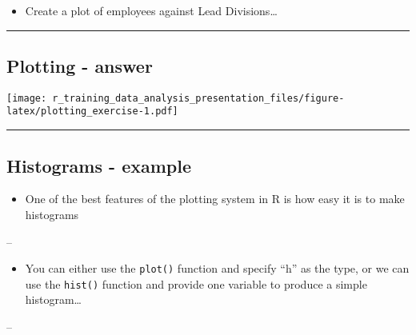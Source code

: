 \documentclass[]{article}
\newenvironment{Shaded}{\begin{snugshade}}{\end{snugshade}}
\newcommand{\DataTypeTok}[1]{\textcolor[rgb]{0.13,0.29,0.53}{#1}}
\newcommand{\KeywordTok}[1]{\textcolor[rgb]{0.13,0.29,0.53}{\textbf{#1}}}
\newcommand{\NormalTok}[1]{#1}
\newcommand{\OperatorTok}[1]{\textcolor[rgb]{0.81,0.36,0.00}{\textbf{#1}}}
\providecommand{\tightlist}{%
  \setlength{\itemsep}{0pt}\setlength{\parskip}{0pt}}
\begin{document}
\begin{itemize}
\tightlist
\item
  Create a plot of employees against Lead Divisions\ldots{}
\end{itemize}

\begin{center}\rule{0.5\linewidth}{\linethickness}\end{center}

\hypertarget{plotting---answer}{%
\subsection{Plotting - answer}\label{plotting---answer}}

\begin{Shaded}
\end{Shaded}

\texttt{[image: r\_training\_data\_analysis\_presentation\_files/figure-latex/plotting\_exercise-1.pdf]}

\begin{center}\rule{0.5\linewidth}{\linethickness}\end{center}

\hypertarget{histograms---example}{%
\subsection{Histograms - example}\label{histograms---example}}

\begin{itemize}
\tightlist
\item
  One of the best features of the plotting system in R is how easy it is
  to make histograms
\end{itemize}

--

\begin{itemize}
\tightlist
\item
  You can either use the \texttt{plot()} function and specify ``h'' as
  the type, or we can use the \texttt{hist()} function and provide one
  variable to produce a simple histogram\ldots{}
\end{itemize}

--
\end{document}
